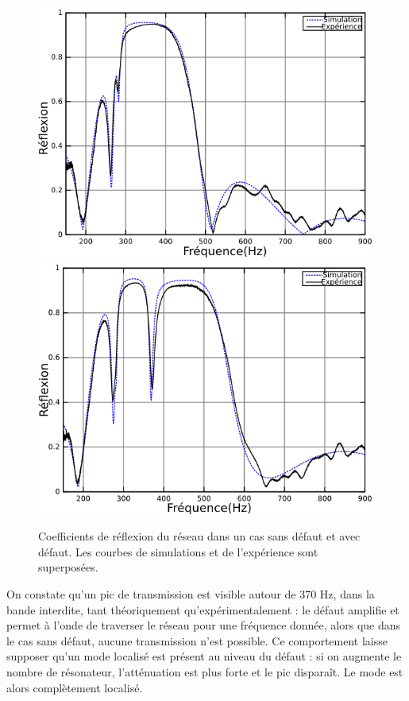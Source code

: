 \begin{figure}[!h]
\centering
\includegraphics[scale=0.3]{images_chp3/R_5HR165_nodefect.png}
\includegraphics[scale=0.3]{images_chp3/R_5HR165_8cm_pos3.png}
\caption{\label{ref_reflexion1} Coefficients de réflexion du réseau dans un cas sans défaut et avec défaut. Les courbes de simulations et de l’expérience sont superposées.}
\end{figure}

On constate qu'un pic de transmission est visible autour de 370 Hz, dans la bande interdite, tant théoriquement qu'expérimentalement : le défaut amplifie et permet à l'onde de traverser le réseau pour une fréquence donnée, alors que dans le cas sans défaut, aucune transmission n'est possible. Ce comportement laisse supposer qu'un mode localisé est présent au niveau du défaut : si on augmente le nombre de résonateur, l'atténuation est plus forte et le pic disparaît. Le mode est alors complètement localisé.

